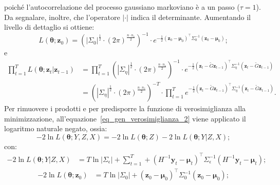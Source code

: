 poiché l'autocorrelazione del processo gaussiano markoviano è a un passo ($\tau = 1$). Da segnalare, inoltre, che l'operatore $|\cdot|$ indica il determinante. Aumentando il livello di dettaglio si ottiene:
\begin{equation}
	L(\boldsymbol{\theta}; \mathbf{z}_0) = \left(|\Sigma_0|^\frac{1}{2}\cdot\left(2\pi\right)^\frac{n\cdot n_z}{2}\right)^{-1}\cdot e^{-\frac{1}{2}\left(\mathbf{z}_0 - \boldsymbol{\mu}_0 \right)^\top\Sigma_0^{-1}\left(\mathbf{z}_0 - \boldsymbol{\mu}_0 \right)};
\end{equation}
e
\begin{equation}
	\begin{split}
		\prod_{t=1}^{T}L(\boldsymbol{\theta};\mathbf{z}_t|\mathbf{z}_{t-1}) & = \prod_{t=1}^{T}\left(|\Sigma_\eta|^\frac{1}{2}\cdot\left(2\pi\right)^\frac{n\cdot n_z}{2}\right)^{-1}\cdot e^{-\frac{1}{2}\left(\mathbf{z}_t - \tilde{G}\boldsymbol{z}_{t-1} \right)^\top\Sigma_\eta^{-1}\left(\mathbf{z}_t - \tilde{G}\boldsymbol{z}_{t-1} \right)}\\
		& = \left(|\Sigma_\eta|^\frac{1}{2}\cdot\left(2\pi\right)^\frac{n\cdot n_z}{2}\right)^{-T}\cdot\prod_{t=1}^{T}e^{-\frac{1}{2}\left(\mathbf{z}_t - \tilde{G}\boldsymbol{z}_{t-1} \right)^\top\Sigma_\eta^{-1}\left(\mathbf{z}_t - \tilde{G}\boldsymbol{z}_{t-1} \right)}.
	\end{split}
\end{equation}
Per rimuovere i prodotti e per predisporre la funzione di verosimiglianza alla minimizzazione, all'equazione~\ref{eq_gen_verosimiglianza_2} viene applicato il logaritmo naturale negato, ossia:
\begin{equation}
	-2\ln L(\boldsymbol{\theta}; Y, Z, X) = -2\ln L(\boldsymbol{\theta}; Z) - 2\ln L(\boldsymbol{\theta}; Y|Z,X);
\end{equation}
con:
\begin{equation}
	\begin{split}
		- 2\ln L(\boldsymbol{\theta}; Y|Z,X) & = T\ln|\Sigma_\epsilon| +\sum_{t=1}^{T}+\left(H^{-1}\mathbf{y}_t - \boldsymbol{\mu}_t\right)^\top\Sigma_\epsilon^{-1}\left(H^{-1}\mathbf{y}_t - \boldsymbol{\mu}_t\right);
	\end{split}
\end{equation}
\begin{equation}
	\begin{split}
		- 2\ln L(\boldsymbol{\theta}; \mathbf{z}_0) & = T\ln|\Sigma_0| + \left(\mathbf{z}_0 - \boldsymbol{\mu}_0 \right)^\top\Sigma_0^{-1}\left(\mathbf{z}_0 - \boldsymbol{\mu}_0 \right);
	\end{split}
\end{equation}
